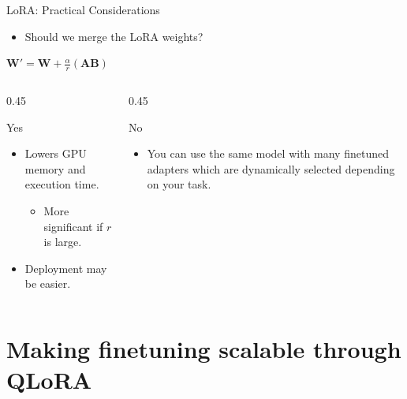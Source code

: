 \documentclass[24pt]{beamer}
\begin{document}
\begin{frame}
{LoRA: Practical Considerations}
    \begin{itemize}
        \item Should we merge the LoRA weights?
    \end{itemize}

    \begin{center}
        $\mathbf{W}' = \mathbf{W} + \frac{\alpha}{r} (\mathbf{A} \mathbf{B})$
    \end{center}

    \begin{columns}
        \begin{column}{0.45\columnwidth}
            \begin{block}{Yes}
                \begin{itemize}
                    \item Lowers \alert{GPU memory} and execution
                    \alert{time}.
                    \begin{itemize}
                        \item More significant if $r$ is large.
                    \end{itemize}
                    \item Deployment may be easier.
                \end{itemize}
            \end{block}
        \end{column}

        \begin{column}{0.45\columnwidth}
            \begin{block}{No}
                \begin{itemize}
                    \item You can use the same model with \alert{many}
                    finetuned adapters which are
                    \alert{dynamically selected} depending on your
                    task.
                \end{itemize}
            \end{block}
        \end{column}
    \end{columns}
\end{frame}


\section{Making finetuning scalable through QLoRA}
\end{document}

